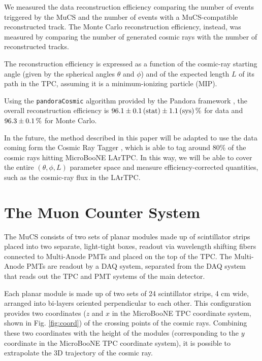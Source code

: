 \documentclass[a4paper]{scrartcl}
\begin{document}
We measured the data reconstruction efficiency comparing the number of events triggered by the MuCS and the number of events with a MuCS-compatible reconstructed track.
The Monte Carlo reconstruction efficiency, instead, was measured by comparing the number of generated cosmic rays with the number of reconstructed tracks.

The reconstruction efficiency is expressed as a function of the cosmic-ray starting angle (given by the spherical angles $\theta$ and $\phi$) and of the expected length $L$ of its path in the TPC, assuming it is a minimum-ionizing particle (MIP).

Using the \texttt{pan\-do\-ra\-Co\-smic} algorithm \cite{pandoracosmic} provided by the Pandora framework \cite{pandora}, the overall reconstruction efficiency is $96.1\pm0.1\thinspace(\mathrm{stat}) \pm 1.1\thinspace(\mathrm{sys})\thinspace\%$ for data and $96.3\pm0.1\thinspace\%$ for Monte Carlo.

In the future, the method described in this paper will be adapted to use the data coming form the Cosmic Ray Tagger \cite{crt}, which is able to tag around 80\% of the cosmic rays hitting MicroBooNE LArTPC. In this way, we will be able to cover the entire $(\theta,\phi,L)$ parameter space and measure efficiency-corrected quantities, such as the cosmic-ray flux in the LArTPC.

\section{The Muon Counter System}\label{sec:proc}
The MuCS consists of two sets of planar modules made up of scintillator strips placed into two separate, light-tight boxes, readout via wavelength shifting fibers connected to Multi-Anode PMTs and placed on the top of the TPC. The Multi-Anode PMTs are readout by a DAQ system, separated from the DAQ system that reads out the TPC and PMT systems of the main detector.

Each planar module is made up of two sets of 24 scintillator strips, 4 cm wide, arranged into bi-layers oriented perpendicular to each other. This configuration provides two coordinates ($z$ and $x$ in the MicroBooNE TPC coordinate system, shown in Fig. \ref{fig:coord}) of the crossing points of the cosmic rays. Combining these two coordinates with the height of the modules (corresponding to the $y$ coordinate in the MicroBooNE TPC coordinate system), it is possible to extrapolate the 3D trajectory of the cosmic ray.
\end{document}
